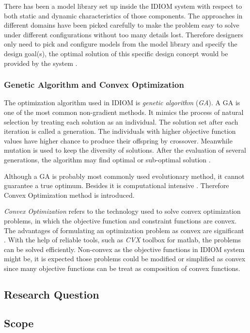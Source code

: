 There has been a model library set up inside the IDIOM system with respect to both static and dynamic characteristics of those components. The approaches in different domains have been picked carefully to make the problem easy to solve under different configurations without too many details lost. Therefore designers only need to pick and configure models from the model library and specify the design goal(s), the optimal solution of this specific design concept would be provided by the system \cite{Holistic}. 

\subsubsection{Genetic Algorithm and Convex Optimization}
The optimization algorithm used in IDIOM is \textit{genetic algorithm} (\textit{GA}). A GA is one of the most common non-gradient methods. It mimics the process of natural selection by treating each solution as an individual. The solution set after each iteration  is called a generation. The individuals with higher objective function values have higher chance to produce their offspring by crossover. Meanwhile mutation is used to keep the diversity of solutions.  After the evaluation of several generations, the algorithm may find optimal or sub-optimal solution \cite{Nongradient}.

Although a GA is probably most commonly used evolutionary method, it cannot guarantee a true optimum. Besides it is computational intensive \cite{Roos}. Therefore Convex Optimization method is introduced.

\textit{Convex Optimization} refers to the technology used to solve convex optimization problems, in which the objective function and constraint functions are convex. The advantages of formulating an optimization problem as convex are significant \cite{Convex}. With the help of reliable tools, such as \textit{CVX} toolbox \cite{CVXtool} for matlab, the problems can be solved efficiently. Non-convex as the objective functions in IDIOM system might be, it is expected those problems could be modified or simplified as convex since many objective functions can be treat as composition of convex functions.

\subsection{Research Question}


\subsection{Scope}
